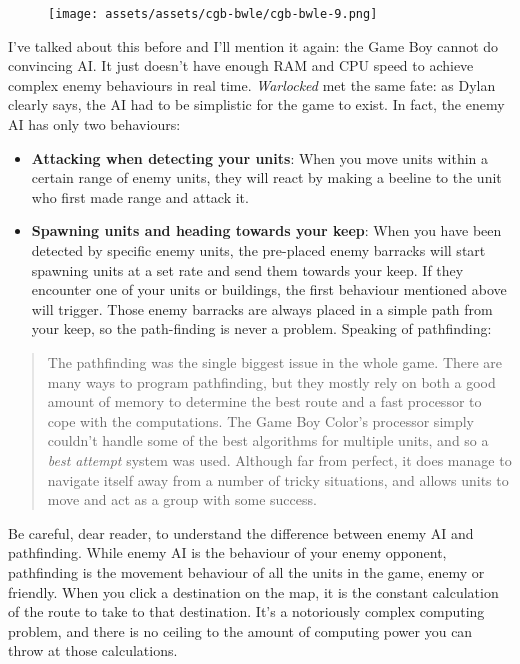 \documentclass{book}
\begin{document}
\begin{figure}[hbt]
\vskip 10pt
\centering \texttt{[image: assets/assets/cgb-bwle/cgb-bwle-9.png]}
\vskip 6pt
\end{figure}

I’ve talked about this before and I’ll mention it again: the Game Boy cannot do convincing AI. It just doesn’t have enough RAM and CPU speed to achieve complex enemy behaviours in real time. \emph{Warlocked} met the same fate: as Dylan clearly says, the AI had to be simplistic for the game to exist. In fact, the enemy AI has only two behaviours:

\begin{itemize} \setlength\itemsep{-0.4em}
\item \textbf{Attacking when detecting your units}: When you move units within a certain range of enemy units, they will react by making a beeline to the unit who first made range and attack it.
\item \textbf{Spawning units and heading towards your keep}: When you have been detected by specific enemy units, the pre-placed enemy barracks will start spawning units at a set rate and send them towards your keep. If they encounter one of your units or buildings, the first behaviour mentioned above will trigger. Those enemy barracks are always placed in a simple path from your keep, so the path-finding is never a problem. Speaking of pathfinding:
\end{itemize}\noindent

\begin{quote}
The pathfinding was the single biggest issue in the whole game. There are many ways to program pathfinding, but they mostly rely on both a good amount of memory to determine the best route and a fast processor to cope with the computations. The Game Boy Color’s processor simply couldn’t handle some of the best algorithms for multiple units, and so a \emph{best attempt} system was used. Although far from perfect, it does manage to navigate itself away from a number of tricky situations, and allows units to move and act as a group with some success.
\end{quote} \par

Be careful, dear reader, to understand the difference between enemy AI and pathfinding. While enemy AI is the behaviour of your enemy opponent, pathfinding is the movement behaviour of all the units in the game, enemy or friendly. When you click a destination on the map, it is the constant calculation of the route to take to that destination. It’s a notoriously complex computing problem, and there is no ceiling to the amount of computing power you can throw at those calculations.
\end{document}
